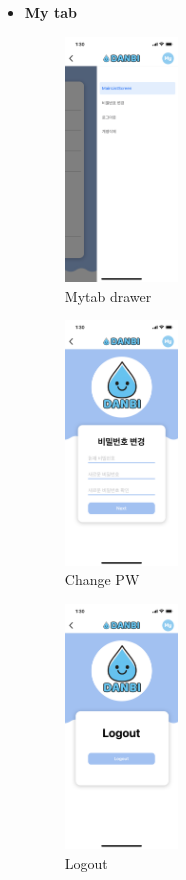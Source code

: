 \documentclass[conference]{IEEEtran}
\begin{document}
\begin{itemize}
\item \textbf{My tab}

\par \begin{figure}[h!]
\includegraphics[width=3cm]{page/MYtab.png}
\centering
\caption{Mytab drawer}
\label{fig:mytab}
\end{figure}

\par \begin{figure}[h!]
\includegraphics[width=3cm]{page/changePW.png}
\centering
\caption{Change PW}
\label{fig:changePW}
\end{figure}

\par \begin{figure}[h!]
\includegraphics[width=3cm]{page/logout.png}
\centering
\caption{Logout}
\label{fig:logout}
\end{figure}


\end{itemize}
\end{document}
